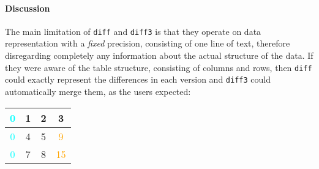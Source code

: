 \documentclass{sigplanconf}
\theoremstyle{plain}
\begin{document}
\paragraph{Discussion}
The main limitation of \texttt{diff} and \texttt{diff3} is that they
operate on data representation with a \emph{fixed} precision,
consisting of one line of text, therefore disregarding completely any
information about the actual structure of the data.
%
If they were aware of the table structure, consisting of columns and
rows, then \texttt{diff} could exactly represent the differences in
each version and \texttt{diff3} could automatically merge them, as the
users expected:
\begin{center}
\begin{tabular}{| c | c | c | c |}
\hline
\textcolor{cyan}{0} & 1 & 2 & 3 \\ \hline
\textcolor{cyan}{0} & 4 & 5 & \textcolor{orange}{9} \\ \hline
\textcolor{cyan}{0} & 7 & 8 & \textcolor{orange}{15} \\ \hline
\end{tabular}
\end{center}

\end{document}
